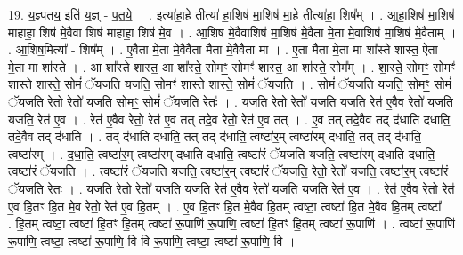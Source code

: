 \documentclass[17pt]{extarticle}
\begin{document}
19. य॒ज्ञ्प॑तय॒ इति॑ य॒ज्ञ् - प॒त॒ये॒ । . इत्या॑हा॒हे तीत्या॑ हा॒शिष॑ मा॒शिष॑ मा॒हे तीत्या॑हा॒ शिष᳚म् । . आ॒हा॒शिष॑ मा॒शिष॑ माहाहा॒ शिष॑ मे॒वैवा शिष॑ माहाहा॒ शिष॑ मे॒व । . आ॒शिष॑ मे॒वैवाशिष॑ मा॒शिष॑ मे॒वैता मे॒ता मे॒वाशिष॑ मा॒शिष॑ मे॒वैताम् । . आ॒शिष॒मित्या᳚ - शिष᳚म् । . ए॒वैता मे॒ता मे॒वैवैता मैता मे॒वैवैता मा । . ए॒ता मैता मे॒ता मा शा᳚स्ते शास्त॒ ऐता मे॒ता मा शा᳚स्ते । . आ शा᳚स्ते शास्त॒ आ शा᳚स्ते॒ सोमꣳ॒॒ सोमꣳ॑ शास्त॒ आ शा᳚स्ते॒ सोम᳚म् । . शा॒स्ते॒ सोमꣳ॒॒ सोमꣳ॑ शास्ते शास्ते॒ सोमं॑ ॅयजति यजति॒ सोमꣳ॑ शास्ते शास्ते॒ सोमं॑ ॅयजति । . सोमं॑ ॅयजति यजति॒ सोमꣳ॒॒ सोमं॑ ॅयजति॒ रेतो॒ रेतो॑ यजति॒ सोमꣳ॒॒ सोमं॑ ॅयजति॒ रेतः॑ । . य॒ज॒ति॒ रेतो॒ रेतो॑ यजति यजति॒ रेत॑ ए॒वैव रेतो॑ यजति यजति॒ रेत॑ ए॒व । . रेत॑ ए॒वैव रेतो॒ रेत॑ ए॒व तत् तदे॒व रेतो॒ रेत॑ ए॒व तत् । . ए॒व तत् तदे॒वैव तद् द॑धाति दधाति॒ तदे॒वैव तद् द॑धाति । . तद् द॑धाति दधाति॒ तत् तद् द॑धाति॒ त्वष्टा॑र॒म् त्वष्टा॑रम् दधाति॒ तत् तद् द॑धाति॒ त्वष्टा॑रम् । . द॒धा॒ति॒ त्वष्टा॑र॒म् त्वष्टा॑रम् दधाति दधाति॒ त्वष्टा॑रं ॅयजति यजति॒ त्वष्टा॑रम् दधाति दधाति॒ त्वष्टा॑रं ॅयजति । . त्वष्टा॑रं ॅयजति यजति॒ त्वष्टा॑र॒म् त्वष्टा॑रं ॅयजति॒ रेतो॒ रेतो॑ यजति॒ त्वष्टा॑र॒म् त्वष्टा॑रं ॅयजति॒ रेतः॑ । . य॒ज॒ति॒ रेतो॒ रेतो॑ यजति यजति॒ रेत॑ ए॒वैव रेतो॑ यजति यजति॒ रेत॑ ए॒व । . रेत॑ ए॒वैव रेतो॒ रेत॑ ए॒व हि॒तꣳ हि॒त मे॒व रेतो॒ रेत॑ ए॒व हि॒तम् । . ए॒व हि॒तꣳ हि॒त मे॒वैव हि॒तम् त्वष्टा॒ त्वष्टा॑ हि॒त मे॒वैव हि॒तम् त्वष्टा᳚ । . हि॒तम् त्वष्टा॒ त्वष्टा॑ हि॒तꣳ हि॒तम् त्वष्टा॑ रू॒पाणि॑ रू॒पाणि॒ त्वष्टा॑ हि॒तꣳ हि॒तम् त्वष्टा॑ रू॒पाणि॑ । . त्वष्टा॑ रू॒पाणि॑ रू॒पाणि॒ त्वष्टा॒ त्वष्टा॑ रू॒पाणि॒ वि वि रू॒पाणि॒ त्वष्टा॒ त्वष्टा॑ रू॒पाणि॒ वि । \newline
\end{document}

